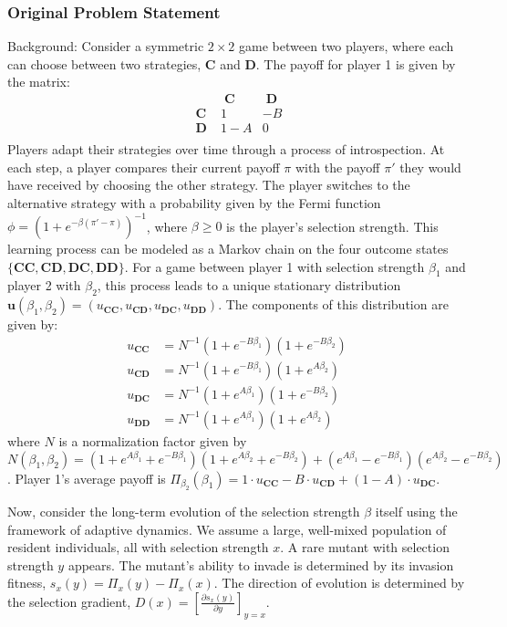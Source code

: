 \documentclass[10pt]{article}
\begin{document}
\subsubsection*{Original Problem Statement}
Background:
Consider a symmetric $2 \times 2$ game between two players, where each can choose between two strategies, $\mathbf{C}$ and $\mathbf{D}$. The payoff for player 1 is given by the matrix:
\begin{equation*}
	\begin{array}{c|cc}
		&\mathbf{\;C\;} &\mathbf{\;D\;}\\
		\hline
		\mathbf{\;C\;} &1 &-B \\
		\mathbf{\;D\;} &1-A &0 \\
	\end{array}
\end{equation*}
Players adapt their strategies over time through a process of introspection. At each step, a player compares their current payoff $\pi$ with the payoff $\pi'$ they would have received by choosing the other strategy. The player switches to the alternative strategy with a probability given by the Fermi function $\phi = (1+e^{-\beta(\pi'-\pi)})^{-1}$, where $\beta \ge 0$ is the player's selection strength. This learning process can be modeled as a Markov chain on the four outcome states $\{\mathbf{CC}, \mathbf{CD}, \mathbf{DC}, \mathbf{DD}\}$. For a game between player 1 with selection strength $\beta_1$ and player 2 with $\beta_2$, this process leads to a unique stationary distribution $\mathbf{u}(\beta_1, \beta_2) = (u_{\mathbf{CC}}, u_{\mathbf{CD}}, u_{\mathbf{DC}}, u_{\mathbf{DD}})$. The components of this distribution are given by:
\begin{align*}
u_{\mathbf{CC}} &= N^{-1} (1+e^{-B\beta_1})(1+e^{-B\beta_2}) \\
u_{\mathbf{CD}} &= N^{-1} (1+e^{-B\beta_1})(1+e^{A\beta_2}) \\
u_{\mathbf{DC}} &= N^{-1} (1+e^{A\beta_1})(1+e^{-B\beta_2}) \\
u_{\mathbf{DD}} &= N^{-1} (1+e^{A\beta_1})(1+e^{A\beta_2})
\end{align*}
where $N$ is a normalization factor given by $N(\beta_1, \beta_2) = (1+e^{A\beta_1}+e^{-B\beta_1})(1+e^{A\beta_2}+e^{-B\beta_2}) + (e^{A\beta_1}-e^{-B\beta_1})(e^{A\beta_2}-e^{-B\beta_2})$. Player 1's average payoff is $\Pi_{\beta_2}(\beta_1) = 1 \cdot u_\mathbf{CC} -B\cdot u_\mathbf{CD} +(1-A)\cdot u_\mathbf{DC}$.

Now, consider the long-term evolution of the selection strength $\beta$ itself using the framework of adaptive dynamics. We assume a large, well-mixed population of resident individuals, all with selection strength $x$. A rare mutant with selection strength $y$ appears. The mutant's ability to invade is determined by its invasion fitness, $s_x(y) = \Pi_x(y) - \Pi_x(x)$. The direction of evolution is determined by the selection gradient, $D(x) = \left[ \frac{\partial s_x(y)}{\partial y } \right]_{y=x}$.
\end{document}
